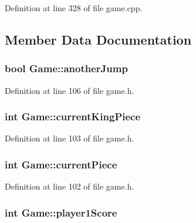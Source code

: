 Definition at line 328 of file game.\-cpp.



\subsection{Member Data Documentation}
\hypertarget{class_game_aa7bf3272e009587fca6a67b486e27418}{
\subsubsection[{another\-Jump}]{\setlength{\rightskip}{0pt plus 5cm}bool Game\-::another\-Jump}}\label{class_game_aa7bf3272e009587fca6a67b486e27418}


Definition at line 106 of file game.\-h.

\hypertarget{class_game_af0938fa4b54d37a0c3099397a58d3cd7}{
\subsubsection[{current\-King\-Piece}]{\setlength{\rightskip}{0pt plus 5cm}int Game\-::current\-King\-Piece}}\label{class_game_af0938fa4b54d37a0c3099397a58d3cd7}


Definition at line 103 of file game.\-h.

\hypertarget{class_game_af6803e417a57dcf56debfd2ecdcc9661}{
\subsubsection[{current\-Piece}]{\setlength{\rightskip}{0pt plus 5cm}int Game\-::current\-Piece}}\label{class_game_af6803e417a57dcf56debfd2ecdcc9661}


Definition at line 102 of file game.\-h.

\hypertarget{class_game_a54d8c544103d5721e83e75c0fb42a4a3}{
\subsubsection[{player1\-Score}]{\setlength{\rightskip}{0pt plus 5cm}int Game\-::player1\-Score}}\label{class_game_a54d8c544103d5721e83e75c0fb42a4a3}


